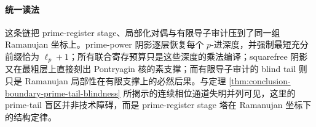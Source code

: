 \paragraph{统一读法}
这条链把 prime-register stage、局部化对偶与有限导子审计压到了同一组 Ramanujan 坐标上。prime-power 阴影逐层恢复每个 \(p\)-进深度，并强制最短充分前缀恰为 \(\ell_p+1\)；所有联合寄存预算只是这些深度的乘法编译；squarefree 阴影又在最粗层上直接刻出 Pontryagin 核的素支撑；而有限导子审计的 blind tail 则只是 Ramanujan 局部性在有限支撑上的必然后果。与定理 \ref{thm:conclusion-boundary-prime-tail-blindness} 所揭示的连续相位通道失明并列可见，这里的 prime-tail 盲区并非技术障碍，而是 prime-register stage 塔在 Ramanujan 坐标下的结构定律。

\endinput
